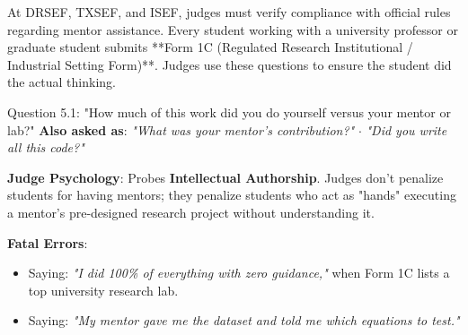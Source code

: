 \documentclass[11pt,letterpaper]{article}
\begin{document}
At DRSEF, TXSEF, and ISEF, judges must verify compliance with official rules regarding mentor assistance. Every student working with a university professor or graduate student submits **Form 1C (Regulated Research Institutional / Industrial Setting Form)**. Judges use these questions to ensure the student did the actual thinking.

\begin{questionbox}{Question 5.1: "How much of this work did you do yourself versus your mentor or lab?"}
\textbf{Also asked as}: \textit{"What was your mentor's contribution?"} $\cdot$ \textit{"Did you write all this code?"}
\end{questionbox}

\begin{strategybox}
\textbf{Judge Psychology}: Probes \textbf{Intellectual Authorship}. Judges don't penalize students for having mentors; they penalize students who act as "hands" executing a mentor's pre-designed research project without understanding it.
\end{strategybox}

\begin{trapbox}
\textbf{Fatal Errors}:
\begin{itemize}
    \item Saying: \textit{"I did 100\% of everything with zero guidance,"} when Form 1C lists a top university research lab.
    \item Saying: \textit{"My mentor gave me the dataset and told me which equations to test."}
\end{itemize}
\end{trapbox}
\end{document}
